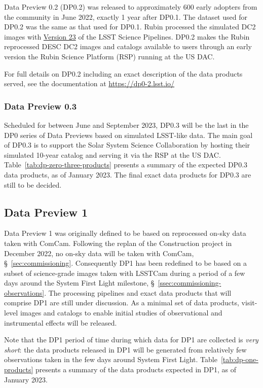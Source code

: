Data Preview 0.2 (DP0.2) was released to approximately 600 early adopters from the community in June 2022, exactly 1 year after DP0.1. 
The dataset used for DP0.2 was the same as that used for DP0.1.
Rubin processed the simulated DC2 images with \href{https://pipelines.lsst.io/v/v23_0_0/index.html}{Version 23} of the LSST Science Pipelines. 
DP0.2 makes the Rubin reprocessed DESC DC2 images and catalogs available to users through an early version the Rubin Science Platform (RSP) running at the US DAC. 

For full details on DP0.2 including an exact description of the data products served, see the documentation at \url{https://dp0-2.lsst.io/}

\subsubsection{Data Preview 0.3}

Scheduled for between June and September 2023, DP0.3 will be the last in the DP0 series of Data Previews based on simulated LSST-like data. 
The main goal of DP0.3 is to support the Solar System Science Collaboration by hosting their simulated 10-year catalog and serving it via the RSP at the US DAC. 
Table~\ref{tab:dp-zero-three-products} presents a summary of the expected DP0.3 data products, as of January 2023.
The final exact data products for DP0.3 are still to be decided. 

\subsection{Data Preview 1}

Data Preview 1 was originally defined to be based on reprocessed on-sky data taken with ComCam.
Following the replan of the Construction project in December 2022, no on-sky data will be taken with ComCam, \S~\ref{sec:commissioning}.
Consequently DP1 has been redefined to be based on a subset of science-grade images taken with LSSTCam during a period of a few days around the System First Light milestone, \S~\ref{ssec:commissioning-observations}.
The processing pipelines and exact data products that will comprise DP1 are still under discussion. 
As a minimal set of data products, visit-level images and catalogs to enable initial studies of observational and instrumental effects will be released. 

Note that the DP1 period of time during which data for DP1 are collected is \textit{very short}: the data products released in DP1 will be generated from relatively few observations taken in the few days around System First Light.
Table~\ref{tab:dp-one-products} presents a summary of the data products expected in DP1, as of January 2023.

